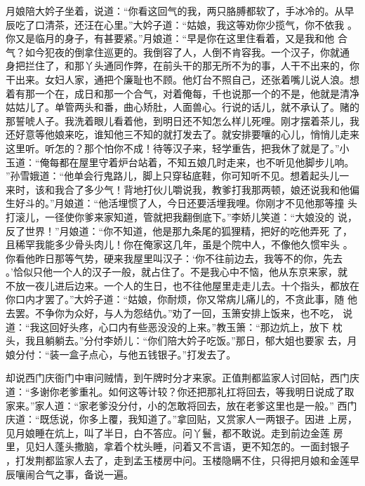 月娘陪大妗子坐着，说道：“你看这回气的我，两只胳膊都软了，手冰冷的。从早
辰吃了口清茶，还汪在心里。”大妗子道：“姑娘，我这等劝你少揽气，你不依我
。你又是临月的身子，有甚要紧。”月娘道：“早是你在这里住看着，又是我和他
合气？如今犯夜的倒拿住巡更的。我倒容了人，人倒不肯容我。一个汉子，你就通
身把拦住了，和那丫头通同作弊，在前头干的那无所不为的事，人干不出来的，你
干出来。女妇人家，通把个廉耻也不顾。他灯台不照自己，还张着嘴儿说人浪。想
着有那一个在，成日和那一个合气，对着俺每，千也说那一个的不是，他就是清净
姑姑儿了。单管两头和番，曲心矫肚，人面兽心。行说的话儿，就不承认了。赌的
那誓唬人子。我洗着眼儿看着他，到明日还不知怎么样儿死哩。刚才摆着茶儿，我
还好意等他娘来吃，谁知他三不知的就打发去了。就安排要嚷的心儿，悄悄儿走来
这里听。听怎的？那个怕你不成！待等汉子来，轻学重告，把我休了就是了。”小
玉道：“俺每都在屋里守着炉台站着，不知五娘几时走来，也不听见他脚步儿响。
”孙雪娥道：“他单会行鬼路儿，脚上只穿毡底鞋，你可知听不见。想着起头儿一
来时，该和我合了多少气！背地打伙儿嚼说我，教爹打我那两顿，娘还说我和他偏
生好斗的。”月娘道：“他活埋惯了人，今日还要活埋我哩。你刚才不见他那等撞
头打滚儿，一径使你爹来家知道，管就把我翻倒底下。”李娇儿笑道：“大娘没的
说，反了世界！”月娘道：“你不知道，他是那九条尾的狐狸精，把好的吃他弄死
了，且稀罕我能多少骨头肉儿！你在俺家这几年，虽是个院中人，不像他久惯牢头
。你看他昨日那等气势，硬来我屋里叫汉子：‘你不往前边去，我等不的你，先去
。’恰似只他一个人的汉子一般，就占住了。不是我心中不恼，他从东京来家，就
不放一夜儿进后边来。一个人的生日，也不往他屋里走走儿去。十个指头，都放在
你口内才罢了。”大妗子道：“姑娘，你耐烦，你又常病儿痛儿的，不贪此事，随
他去罢。不争你为众好，与人为怨结仇。”劝了一回，玉箫安排上饭来，也不吃，
说道：“我这回好头疼，心口内有些恶没没的上来。”教玉箫：“那边炕上，放下
枕头，我且躺躺去。”分付李娇儿：“你们陪大妗子吃饭。”那日，郁大姐也要家
去，月娘分付：“装一盒子点心，与他五钱银子。”打发去了。

却说西门庆衙门中审问贼情，到午牌时分才来家。正值荆都监家人讨回帖，西门庆
道：“多谢你老爹重礼。如何这等计较？你还把那礼扛将回去，等我明日说成了取
家来。”家人道：“家老爹没分付，小的怎敢将回去，放在老爹这里也是一般。”
西门庆道：“既恁说，你多上覆，我知道了。”拿回贴，又赏家人一两银子。因进
上房，见月娘睡在炕上，叫了半日，白不答应。问丫鬟，都不敢说。走到前边金莲
房里，见妇人蓬头撒脑，拿着个枕头睡，问着又不言语，更不知怎的。一面封银子
，打发荆都监家人去了，走到孟玉楼房中问。玉楼隐瞒不住，只得把月娘和金莲早
辰嚷闹合气之事，备说一遍。


